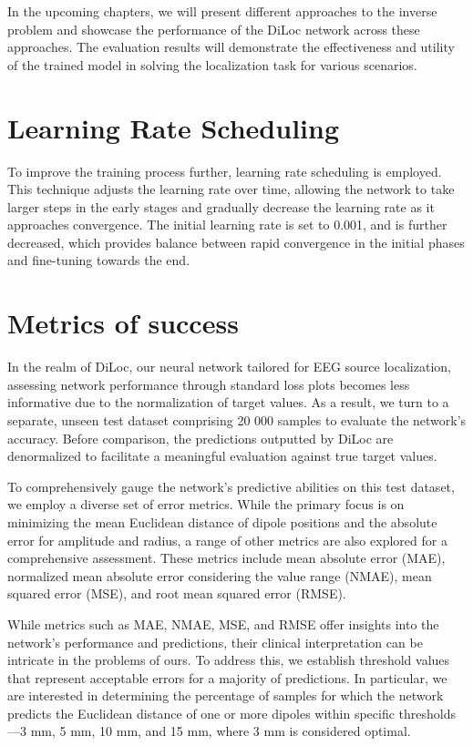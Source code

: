 \documentclass[a4paper, UKenglish, 11pt]{uiomaster}
\begin{document}
In the upcoming chapters, we will present different approaches to the inverse problem and showcase the performance of the DiLoc network across these approaches. The evaluation results will demonstrate the effectiveness and utility of the trained model in solving the localization task for various scenarios.

\section{Learning Rate Scheduling}
To improve the training process further, learning rate scheduling is employed. This technique adjusts the learning rate over time, allowing the network to take larger steps in the early stages and gradually decrease the learning rate as it approaches convergence. The initial learning rate is set to 0.001, and is further decreased, which provides balance between rapid convergence in the initial phases and fine-tuning towards the end.




\section{Metrics of success}
In the realm of DiLoc, our neural network tailored for EEG source localization, assessing network performance through standard loss plots becomes less informative due to the normalization of target values. As a result, we turn to a separate, unseen test dataset comprising 20 000 samples to evaluate the network's accuracy. Before comparison, the predictions outputted by DiLoc are denormalized to facilitate a meaningful evaluation against true target values.

To comprehensively gauge the network's predictive abilities on this test dataset, we employ a diverse set of error metrics. While the primary focus is on minimizing the mean Euclidean distance of dipole positions and the absolute error for amplitude and radius, a range of other metrics are also explored for a comprehensive assessment. These metrics include mean absolute error (MAE), normalized mean absolute error considering the value range (NMAE), mean squared error (MSE), and root mean squared error (RMSE).

While metrics such as MAE, NMAE, MSE, and RMSE offer insights into the network's performance and predictions, their clinical interpretation can be intricate in the problems of ours. To address this, we establish threshold values that represent acceptable errors for a majority of predictions. In particular, we are interested in determining the percentage of samples for which the network predicts the Euclidean distance of one or more dipoles within specific thresholds—3 mm, 5 mm, 10 mm, and 15 mm, where 3 mm is considered optimal.
\end{document}
